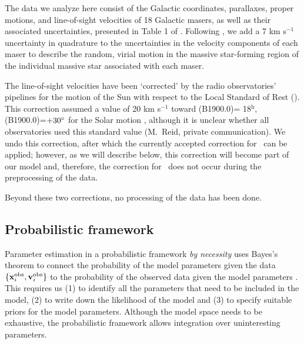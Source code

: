 The data we analyze here consist of the Galactic coordinates,
parallaxes, proper motions, and line-of-sight velocities of 18
Galactic masers, as well as their associated uncertainties, presented
in Table 1 of \citet{Reid09a}. Following \reid, we add a 7 km s$^{-1}$
uncertainty in quadrature to the uncertainties in the velocity
components of each maser to describe the random, virial motion in the
massive star-forming region of the individual massive star associated
with each maser.

The line-of-sight velocities have been `corrected' by the radio
observatories' pipelines for the motion of the Sun with respect to the
Local Standard of Rest (\lsr). This correction assumed a value of 20
km s$^{-1}$ toward \ra(B1900.0)= 18$^\mathrm{h}$,
\dec(B1900.0)=$+30^{\circ}$ for the Solar motion \vsunlsr, although it
is unclear whether all observatories used this standard value
(M.~Reid, private communication). We undo this correction, after
which the currently accepted correction for \vsunlsr\ can be applied;
however, as we will describe below, this correction will become part
of our model and, therefore, the correction for \vsunlsr\ does not
occur during the preprocessing of the data.

Beyond these two corrections, no processing of the \citet{Reid09a}
data has been done.


\subsection{Probabilistic framework}

Parameter estimation in a probabilistic framework \emph{by necessity}
uses Bayes's theorem to connect the probability of the model
parameters given the data
$\{\boldsymbol{\mathbf{x}}_i^{\mathrm{obs}},\boldsymbol{\mathbf{v}}_i^{\mathrm{obs}}\}$ to the probability of
the observed data given the model parameters
\citep[\eg,][]{jaynes}. This requires us (1) to identify all the
parameters that need to be included in the model, (2) to write down
the likelihood of the model and (3) to specify suitable priors for the
model parameters. Although the model space needs to be exhaustive, the
probabilistic framework allows integration over uninteresting
parameters.


